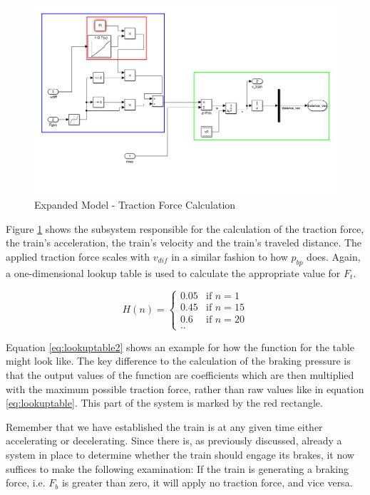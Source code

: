 \begin{figure}[H]
	\centering
	\includegraphics[width=\linewidth]{./pic/expandedmodel_force}
	\caption{Expanded Model - Traction Force Calculation}
	\label{fig:expandedmodel_force}
\end{figure}

\par\noindent
Figure \ref{fig:expandedmodel_force} shows the subsystem responsible for the calculation of the traction force, the train's acceleration, the train's velocity and the train's traveled distance. The applied traction force scales with $v_{dif}$ in a similar fashion to how $p_{bp}$ does. Again, a one-dimensional lookup table is used to calculate the appropriate value for $F_{t}$.

\begin{equation}
\label{eq:lookuptable2}
H(n) =
\begin{cases}
0.05 & \text{if $n=1$} \\
0.45 & \text{if $n=15$} \\
0.6 & \text{if $n=20$} \\
\text{..}
\end{cases}
\end{equation}

\noindent
Equation \ref{eq:lookuptable2} shows an example for how the function for the table might look like. The key difference to the calculation of the braking pressure is that the output values of the function are coefficients which are then multiplied with the maximum possible traction force, rather than raw values like in equation \ref{eq:lookuptable}. This part of the system is marked by the red rectangle. 
\par
Remember that we have established the train is at any given time either accelerating or decelerating. Since there is, as previously discussed, already a system in place to determine whether the train should engage its brakes, it now suffices to make the following examination: If the train is generating a braking force, i.e. $F_{b}$ is greater than zero, it will apply no traction force, and vice versa.
 
